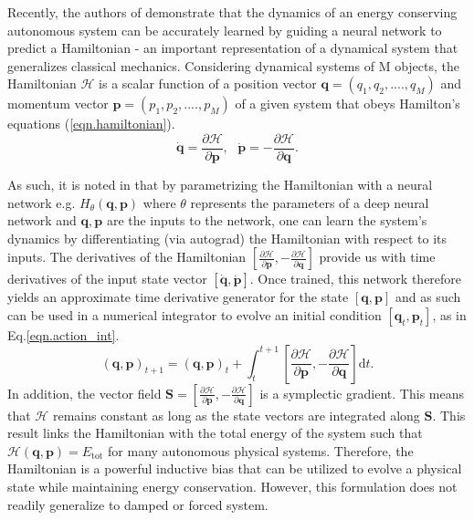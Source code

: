 \documentclass{article}
\begin{document}
Recently, the authors of \cite{greydanus_hamiltonian_2019} demonstrate that the dynamics of an energy conserving autonomous system can be accurately learned by guiding a neural network to predict a Hamiltonian - an important representation of a dynamical system that generalizes classical mechanics. Considering dynamical systems of M objects, the Hamiltonian $\mathcal{H}$ is a scalar function of a position vector $\mathbf{q} = (q_1,q_2,....,q_M)$ and momentum vector $\mathbf{p} = (p_1,p_2,....,p_M)$ of a given system that obeys Hamilton's equations (\ref{eqn.hamiltonian}).
\begin{equation}
\dot{\mathbf{q}}= \frac{\partial \mathcal{H}}{\partial \mathbf{p}}, ~~~
\dot{\mathbf{p}}= -\frac{\partial \mathcal{H}}{\partial \mathbf{q}}.
\label{eqn.hamiltonian}
\end{equation}

As such, it is noted in \cite{greydanus_hamiltonian_2019} that by parametrizing the Hamiltonian with a neural network e.g. $H_{\theta}(\mathbf{q},\mathbf{p})$ where $\theta$ represents the parameters of a deep neural network and $\mathbf{q},\mathbf{p}$ are the inputs to the network, one can learn the system's dynamics by differentiating (via autograd) the Hamiltonian with respect to its inputs. The derivatives of the Hamiltonian $\left [ \frac{\partial \mathcal{H}}{\partial \mathbf{p}},-\frac{\partial \mathcal{H}}{\partial \mathbf{q}} \right ]$ provide us with time derivatives of the input state vector $[\dot{\mathbf{q}},\dot{\mathbf{p}}]$. Once trained, this network therefore yields an approximate time derivative generator for the state $[\mathbf{q},\mathbf{p}]$ and as such can be used in a numerical integrator to evolve an initial condition $[\mathbf{q}_t,\mathbf{p}_t]$, as in Eq.\ref{eqn.action_int}.
\begin{equation}
(\mathbf{q},\mathbf{p})_{t+1} = (\mathbf{q},\mathbf{p})_t + \int_t^{t+1} \left [ \frac{\partial \mathcal{H}}{\partial \mathbf{p}},-\frac{\partial \mathcal{H}}{\partial \mathbf{q}} \right ] \mathrm{d}t.
\label{eqn.action_int}
\end{equation}
In addition, the vector field $\mathbf{S} = \left [ \frac{\partial \mathcal{H}}{\partial \mathbf{p}},-\frac{\partial \mathcal{H}}{\partial \mathbf{q}} \right ]$ is a symplectic gradient. This means that $\mathcal{H}$ remains constant as long as the state vectors are integrated along $\mathbf{S}$. This result links the Hamiltonian with the total energy of the system such that $\mathcal{H}(\mathbf{q},\mathbf{p}) = E_{\mathrm{tot}}$ for many autonomous physical systems. Therefore, the Hamiltonian is a powerful inductive bias that can be utilized to evolve a physical state while maintaining energy conservation. However, this formulation does not readily generalize to damped or forced system.
\end{document}
